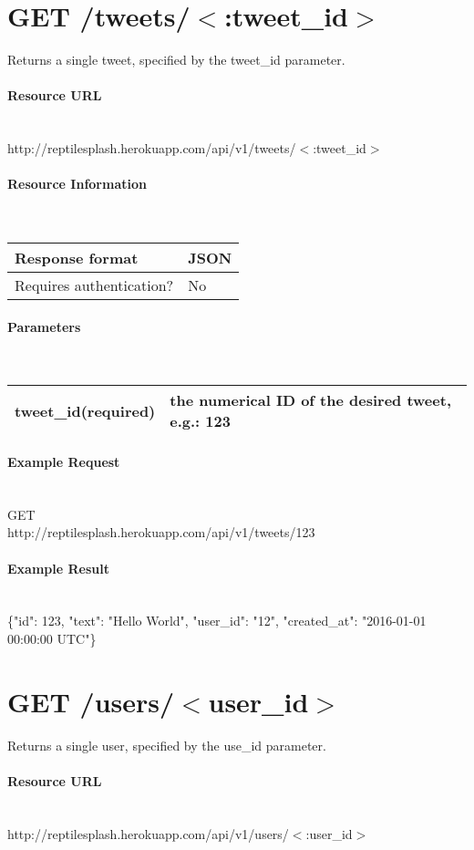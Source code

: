 \documentclass{article}
\begin{document}
	\section*{GET /tweets/$<$:tweet\_id$>$}
	Returns a single tweet, specified by the tweet\_id parameter. 
	\paragraph{Resource URL} \mbox{} \\
	http://reptilesplash.herokuapp.com/api/v1/tweets/$<$:tweet\_id$>$
	\paragraph{Resource Information} \mbox{} \\
	\begin{tabular}{ll}
		\hline
		Response format & JSON \\ \hline
		Requires authentication? & No \\ \hline
	\end{tabular}
	\paragraph{Parameters} \mbox{} \\
	\begin{tabular}{ll}
		\hline
		tweet\_id(required) & the numerical ID of the desired tweet, e.g.: 123\\ \hline
	\end{tabular}
	\paragraph{Example Request} \mbox{} \\
	GET \\
	http://reptilesplash.herokuapp.com/api/v1/tweets/123 
	\paragraph{Example Result} \mbox{} \\
	\{"id": 123, "text": "Hello World", "user\_id": "12", "created\_at": "2016-01-01 00:00:00 UTC"\}
	
	
	\section*{GET /users/$<$user\_id$>$}
	Returns a single user, specified by the use\_id parameter. 
	\paragraph{Resource URL} \mbox{} \\
	http://reptilesplash.herokuapp.com/api/v1/users/$<$:user\_id$>$
\end{document}
